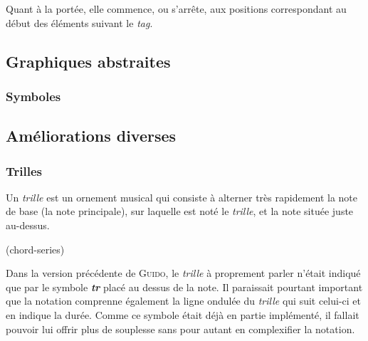 \documentclass{article}
\newenvironment{gmncode}	{\vspace{-2mm}\small\verbatim}{\endverbatim\vspace{-2mm}}
\newcommand{\guido}			{\textsc{Guido}}
\begin{document}
Quant à la portée, elle commence, ou s'arrête, aux positions correspondant au début des éléments suivant le \emph{tag}.


\subsection{Graphiques abstraites}\label{subsec:graphiquesAbstraites}


\subsubsection{Symboles}\label{subsubsec:symboles}



\subsection{Améliorations diverses}\label{subsec:amelioraions}


\subsubsection{Trilles}\label{subsubsec:trilles}


Un \emph{trille} est \og{}un ornement musical qui consiste à alterner très rapidement la note de base (la note principale), sur laquelle est noté le \emph{trille}, et la note située juste au-dessus\fg{}.

\begin{gmncode}
(chord-series)
\end{gmncode}

Dans la version précédente de \guido, le \emph{trille} à proprement parler n'était indiqué que par le symbole \textit{\textbf{tr}} placé au dessus de la note. Il paraissait pourtant important que la notation comprenne également la ligne ondulée du \emph{trille} qui suit celui-ci et en indique la durée. Comme ce symbole était déjà en partie implémenté, il fallait pouvoir lui offrir plus de souplesse sans pour autant en complexifier la notation.

\end{document}

